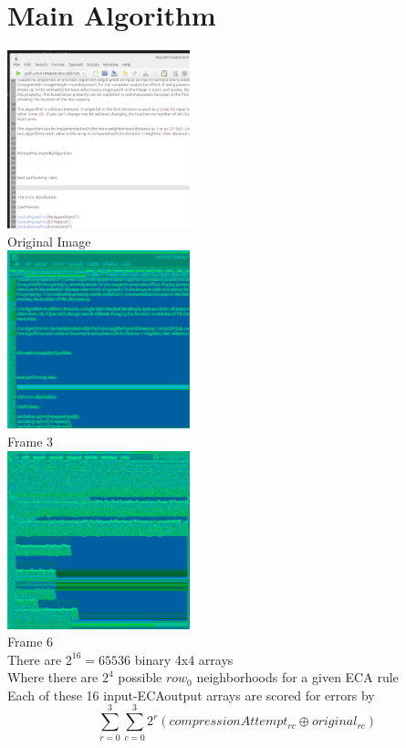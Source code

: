 \documentclass[11pt]{article}
\begin{document}
\section{Main Algorithm}
\begin{center}
\includegraphics{testScreenshot}\\
Original Image\\
\includegraphics{processedDepth3}\\
Frame 3\\
\includegraphics{processedDepth6}\\
Frame 6\\
There are $2^{16}=65536$ binary 4x4 arrays\\
 Where there are $2^4$ possible $row_0$ neighborhoods for a given ECA rule\\
 Each of these 16 input-ECAoutput arrays are scored for errors by\\
\[  \sum_{r=0}^{3} \sum_{c=0}^{3} 2^r ( compressionAttempt_{r c} \oplus original_{r c}) \]\\

\end{center}
\end{document}
